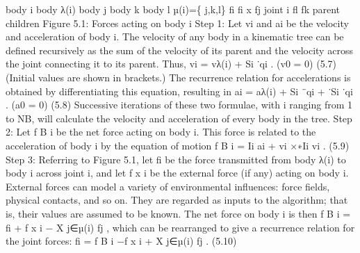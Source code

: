 body i body λ(i) body j body k body l µ(i)=\{ j,k,l\} fi fi x fj joint i fl fk parent children Figure 5.1: Forces acting on body i Step 1: Let vi and ai be the velocity and acceleration of body i. The velocity of any body in a kinematic tree can be defined recursively as the sum of the velocity of its parent and the velocity across the joint connecting it to its parent. Thus, vi = vλ(i) + Si ˙qi . (v0 = 0) (5.7) (Initial values are shown in brackets.) The recurrence relation for accelerations is obtained by differentiating this equation, resulting in ai = aλ(i) + Si ¨qi + ˙Si ˙qi . (a0 = 0) (5.8) Successive iterations of these two formulae, with i ranging from 1 to NB, will calculate the velocity and acceleration of every body in the tree. Step 2: Let f B i be the net force acting on body i. This force is related to the acceleration of body i by the equation of motion f B i = Ii ai + vi ×∗Ii vi . (5.9) Step 3: Referring to Figure 5.1, let fi be the force transmitted from body λ(i) to body i across joint i, and let f x i be the external force (if any) acting on body i. External forces can model a variety of environmental influences: force fields, physical contacts, and so on. They are regarded as inputs to the algorithm; that is, their values are assumed to be known. The net force on body i is then f B i = fi + f x i − X j∈µ(i) fj , which can be rearranged to give a recurrence relation for the joint forces: fi = f B i −f x i + X j∈µ(i) fj . (5.10)

